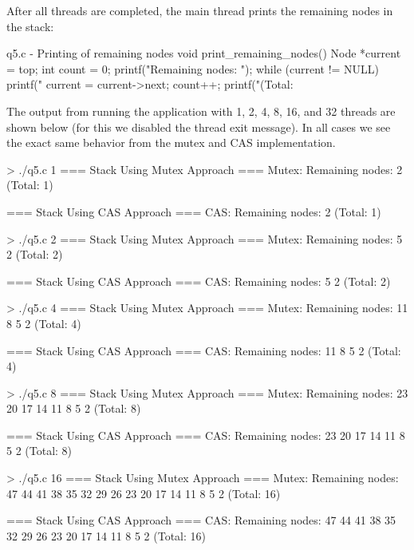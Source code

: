 \documentclass[../main.tex]{subfiles}
\begin{document}
After all threads are completed, the main thread prints the remaining nodes in the stack:

\begin{cppcode}{q5.c - Printing of remaining nodes}
void print_remaining_nodes() {
    Node *current = top;
    int count = 0;
    printf("Remaining nodes: ");
    while (current != NULL) {
        printf("%
        current = current->next;
        count++;
    }
    printf("(Total: %
}
\end{cppcode}

The output from running the application with 1, 2, 4, 8, 16, and 32 threads are shown below (for this we disabled the thread exit message). In all cases we see the exact same behavior from the mutex and CAS implementation.

\begin{textcode}{> ./q5.c 1}
=== Stack Using Mutex Approach ===
Mutex: Remaining nodes: 2 (Total: 1)

=== Stack Using CAS Approach ===
CAS: Remaining nodes: 2 (Total: 1)
\end{textcode}

\begin{textcode}{> ./q5.c 2}
=== Stack Using Mutex Approach ===
Mutex: Remaining nodes: 5 2 (Total: 2)

=== Stack Using CAS Approach ===
CAS: Remaining nodes: 5 2 (Total: 2)
\end{textcode}

\begin{textcode}{> ./q5.c 4}
=== Stack Using Mutex Approach ===
Mutex: Remaining nodes: 11 8 5 2 (Total: 4)

=== Stack Using CAS Approach ===
CAS: Remaining nodes: 11 8 5 2 (Total: 4)
\end{textcode}

\begin{textcode}{> ./q5.c 8}
=== Stack Using Mutex Approach ===
Mutex: Remaining nodes: 23 20 17 14 11 8 5 2 (Total: 8)

=== Stack Using CAS Approach ===
CAS: Remaining nodes: 23 20 17 14 11 8 5 2 (Total: 8)
\end{textcode}

\begin{textcode}{> ./q5.c 16}
=== Stack Using Mutex Approach ===
Mutex: Remaining nodes: 47 44 41 38 35 32 29 26 23 20 17 14 11 8 5 2 (Total: 16)

=== Stack Using CAS Approach ===
CAS: Remaining nodes: 47 44 41 38 35 32 29 26 23 20 17 14 11 8 5 2 (Total: 16)
\end{textcode}
\end{document}
